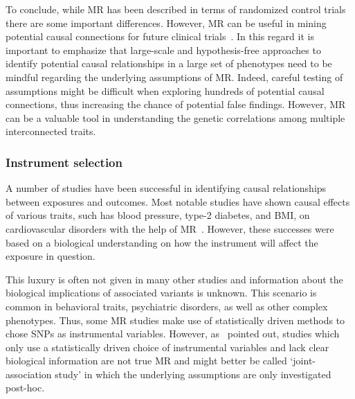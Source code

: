 To conclude, while MR has been described in terms of randomized control trials there are some important differences.
However, MR can be useful in mining potential causal connections for future clinical trials~\cite{Evans2015}. 
In this regard it is important to emphasize that large-scale and hypothesis-free approaches to identify potential causal relationships in a large set of phenotypes need to be mindful regarding the underlying assumptions of MR\@.
Indeed, careful testing of assumptions might be difficult when exploring hundreds of potential causal connections,
thus increasing the chance of potential false findings.
However, MR can be a valuable tool in understanding the genetic correlations among multiple interconnected traits. 

\subsubsection{Instrument selection}
\label{ssub:instrument_selection}

A number of studies have been successful in identifying causal relationships between exposures and outcomes.
Most notable studies have shown causal effects of various traits, such has blood pressure, type-2 diabetes, and BMI, on cardiovascular disorders with the help of MR~\cite{Swerdlow,Ference2015,Lieb2013,Voight2012a}.
However, these successes were based on a biological understanding on how the instrument will affect the exposure in question.

This luxury is often not given in many other studies and information about the biological implications of associated variants is unknown.
This scenario is common in behavioral traits, psychiatric disorders, as well as other complex phenotypes.
Thus, some MR studies make use of statistically driven methods to chose SNPs as instrumental variables.
However, as~\citet{Burgess2016a} pointed out, studies which only use a statistically driven choice of instrumental variables and lack clear biological information are not true MR and might better be called `joint-association study' in which the underlying assumptions are only investigated post-hoc.


